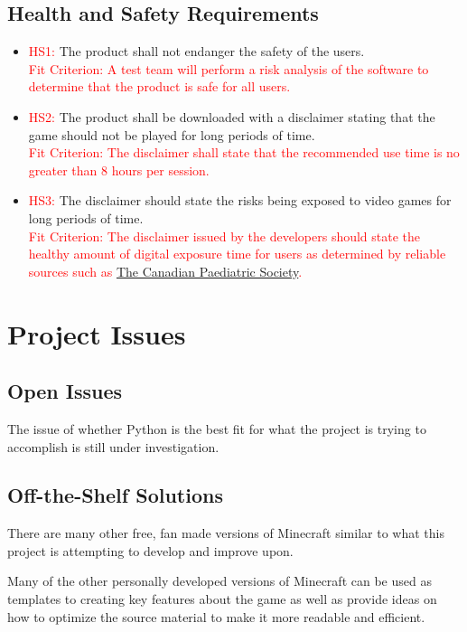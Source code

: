\documentclass[12pt, titlepage]{article}
\begin{document}
\subsection{Health and Safety Requirements}

\begin{itemize}
    \item \textcolor{red}{HS1: }The product shall not endanger the safety of the users.\\
    \textcolor{red}{Fit Criterion: A test team will perform a risk analysis of the software to determine that the product is safe for all users.}
    \item \textcolor{red}{HS2: }The product shall be downloaded with a disclaimer stating that the game should not be played for long periods of time.\\
    \textcolor{red}{Fit Criterion: The disclaimer shall state that the recommended use time is no greater than 8 hours per session.}
    \item \textcolor{red}{HS3: }The disclaimer should state the risks being exposed to video games for long periods of time.\\
    \textcolor{red}{Fit Criterion: The disclaimer issued by the developers should state the healthy amount of digital exposure time for users as determined by reliable sources such as \href{https://www.cps.ca/en/documents/position/screen-time-and-young-children}{The Canadian Paediatric Society}.}
\end{itemize}
\section{Project Issues}

\subsection{Open Issues}
The issue of whether Python is the best fit for what the project is trying to accomplish is still under investigation.

\subsection{Off-the-Shelf Solutions}
There are many other free, fan made versions of Minecraft similar to what this project is attempting to develop and improve upon.

Many of the other personally developed versions of Minecraft can be used as templates to creating key features about the game as well as provide ideas on how to optimize the source material to make it more readable and efficient.
\end{document}

